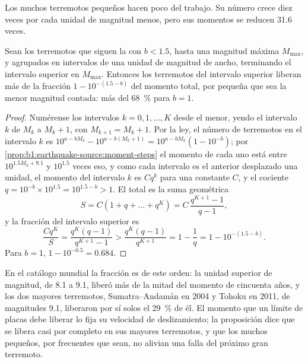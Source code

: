 Los muchos terremotos pequeños hacen poco del trabajo. Su número crece diez veces por cada unidad de magnitud menos, pero sus momentos se
reducen 31.6 veces.

\begin{proposition}\label{prop:b1:earthquake-source:largest}
Sean los terremotos que siguen la  con $b < 1.5$, hasta una magnitud máxima $M_{\max}$, y agrupados en intervalos
de una unidad de magnitud de ancho, terminando el intervalo superior en $M_{\max}$. Entonces los terremotos del intervalo superior liberan más
de la fracción $1 - 10^{-(1.5 - b)}$ del momento total, por pequeña que sea la menor magnitud contada: más del \qty{68}{\percent} para $b = 1$.
\end{proposition}

\begin{proof}
Numérense los intervalos $k = 0, 1, \dots, K$ desde el menor, yendo el intervalo $k$ de $M_k$ a $M_k + 1$, con $M_{k+1} = M_k + 1$. Por la ley, el número
de terremotos en el intervalo $k$ es $10^{a - bM_k} - 10^{a - b(M_k+1)} =
10^{a - bM_k}(1 - 10^{-b})$; por \cref{prop:b1:earthquake-source:moment-steps}
el momento de cada uno está entre $10^{1.5M_k + 9.1}$ y $10^{1.5}$ veces eso,
y como cada intervalo es el anterior desplazado una unidad, el momento del
intervalo $k$ es $C q^k$ para una constante $C$, y el cociente
$q = 10^{-b}\times10^{1.5} = 10^{1.5 - b} > 1$. El total es la suma geométrica
\[
  S = C(1 + q + \dots + q^K) = C\,\frac{q^{K+1} - 1}{q - 1} ,
\]
y la fracción del intervalo superior es
\[
  \frac{C q^K}{S} = \frac{q^K (q - 1)}{q^{K+1} - 1}
  > \frac{q^K (q - 1)}{q^{K+1}} = 1 - \frac1q = 1 - 10^{-(1.5 - b)} .
\]
Para $b = 1$, $1 - 10^{-0.5} = 0.684$.
\end{proof}

En el catálogo mundial la fracción es de este orden: la unidad superior de magnitud, de 8.1 a 9.1, liberó más de la mitad del momento de
cincuenta años, y los dos mayores terremotos, Sumatra--Andamán en 2004 y Tohoku en 2011, de magnitudes 9.1, liberaron por sí solos el
\qty{29}{\percent} de él. El momento que un límite de placas debe liberar lo fija su velocidad de deslizamiento; la proposición dice que se
libera casi por completo en sus mayores terremotos, y que los muchos pequeños, por frecuentes que sean, no alivian una falla del próximo
gran terremoto.


